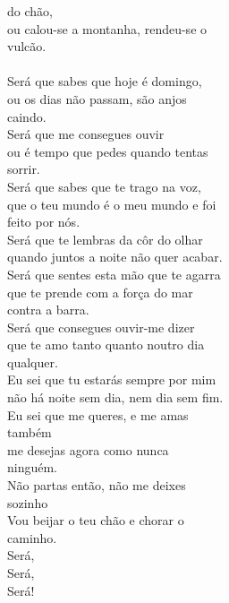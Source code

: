 \documentclass{article}
\begin{document}
do chão,\\
ou calou-se a montanha, rendeu-se o\\
vulcão.\\
\\
Será que sabes que hoje é domingo,\\
ou os dias não passam, são anjos\\
caindo.\\
Será que me consegues ouvir\\
ou é tempo que pedes quando tentas\\
sorrir.\\
Será que sabes que te trago na voz,\\
que o teu mundo é o meu mundo e foi\\
feito por nós.\\
Será que te lembras da côr do olhar\\
quando juntos a noite não quer acabar.\\
Será que sentes esta mão que te agarra\\
que te prende com a força do mar\\
contra a barra.\\
Será que consegues ouvir-me dizer\\
que te amo tanto quanto noutro dia\\
qualquer.\\
Eu sei que tu estarás sempre por mim\\
não há noite sem dia, nem dia sem fim.\\
Eu sei que me queres, e me amas\\
também\\
me desejas agora como nunca\\
ninguém.\\
Não partas então, não me deixes\\
sozinho\\
Vou beijar o teu chão e chorar o\\
caminho.\\
Será,\\
Será,\\
Será!\\
\end{document}
